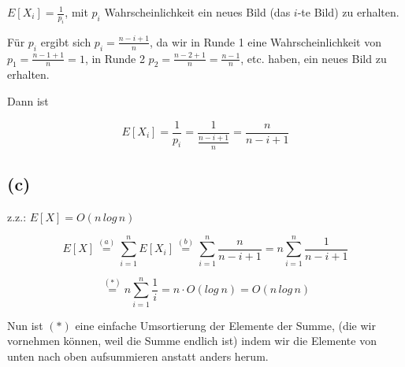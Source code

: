 $E[X_{i}]=\frac{1}{p_{i}}$, mit $p_{i}$ Wahrscheinlichkeit ein neues
Bild (das $i$-te Bild) zu erhalten.

Für $p_{i}$ ergibt sich $p_{i}=\frac{n-i+1}{n}$, da wir in Runde
1 eine Wahrscheinlichkeit von $p_{1}=\frac{n-1+1}{n}=1$, in Runde
2 $p_{2}=\frac{n-2+1}{n}=\frac{n-1}{n}$, etc. haben, ein neues Bild
zu erhalten.

Dann ist

\[
E[X_{i}]=\frac{1}{p_{i}}=\frac{1}{\frac{n-i+1}{n}}=\frac{n}{n-i+1}
\]




\subsection*{(c)}


z.z.: $E[X]=O(n\, log\, n)$

\[
E[X]\stackrel{(a)}{=}\sum_{i=1}^{n}E[X_{i}]\stackrel{(b)}{=}\sum_{i=1}^{n}\frac{n}{n-i+1}=n\sum_{i=1}^{n}\frac{1}{n-i+1}
\]


\[
\stackrel{(*)}{=}n\sum_{i=1}^{n}\frac{1}{i}=n\cdot O(log\: n)=O(n\, log\, n)
\]

Nun ist $(*)$ eine einfache Umsortierung der Elemente der Summe, (die wir vornehmen können, weil die Summe endlich ist) indem
wir die Elemente von unten nach oben aufsummieren anstatt anders herum.
